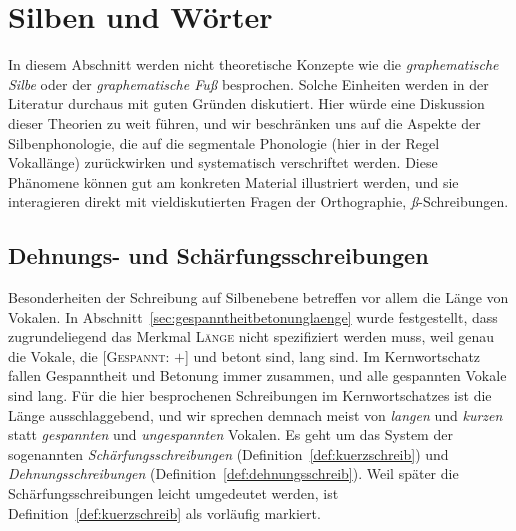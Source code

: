 \section{Silben und Wörter}

\label{sec:silbenschreib}

In diesem Abschnitt werden nicht theoretische Konzepte wie die \textit{graphematische Silbe} oder der \textit{graphematische Fuß} besprochen.
Solche Einheiten werden in der Literatur durchaus mit guten Gründen diskutiert.
Hier würde eine Diskussion dieser Theorien zu weit führen, und wir beschränken uns auf die Aspekte der Silbenphonologie, die auf die segmentale Phonologie (hier in der Regel Vokallänge) zurückwirken und systematisch verschriftet werden.
Diese Phänomene können gut am konkreten Material illustriert werden, und sie interagieren direkt mit vieldiskutierten Fragen der Orthographie, \zB \textit{ß}-Schreibungen.

\subsection{Dehnungs- und Schärfungsschreibungen}

\label{sec:laengeschreib}

Besonderheiten der Schreibung auf Silbenebene betreffen vor allem die Länge von Vokalen.
In Abschnitt~\ref{sec:gespanntheitbetonunglaenge} wurde festgestellt, dass zugrundeliegend das Merkmal \textsc{Länge} nicht spezifiziert werden muss, weil genau die Vokale, die [\textsc{Gespannt}: $+$] und betont sind, lang sind.
Im Kernwortschatz fallen Gespanntheit und Betonung immer zusammen, und alle gespannten Vokale sind lang.
Für die hier besprochenen Schreibungen im Kernwortschatzes ist die Länge ausschlaggebend, und wir sprechen demnach meist von \textit{langen} und \textit{kurzen} statt \textit{gespannten} und \textit{ungespannten} Vokalen.
Es geht um das System der sogenannten \textit{Schärfungsschreibungen} (Definition~\ref{def:kuerzschreib}) und \textit{Dehnungsschreibungen} (Definition~\ref{def:dehnungsschreib}).
Weil später die Schärfungsschreibungen leicht umgedeutet werden, ist Definition~\ref{def:kuerzschreib} als vorläufig markiert.



